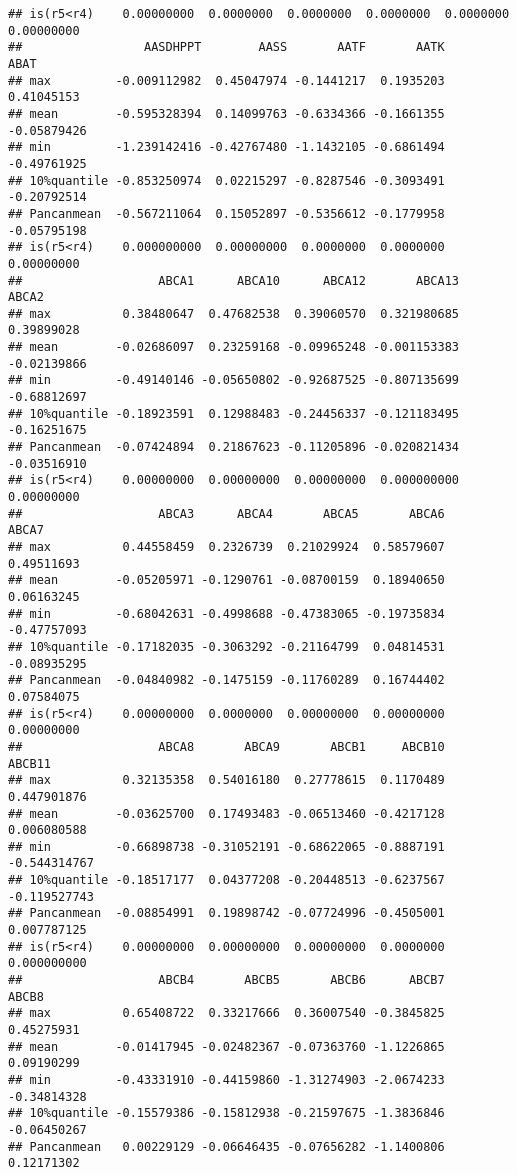 \documentclass[
]{article}
\begin{document}
\begin{verbatim}
## is(r5<r4)    0.00000000  0.0000000  0.0000000  0.0000000  0.0000000  0.00000000
##                 AASDHPPT        AASS       AATF       AATK        ABAT
## max         -0.009112982  0.45047974 -0.1441217  0.1935203  0.41045153
## mean        -0.595328394  0.14099763 -0.6334366 -0.1661355 -0.05879426
## min         -1.239142416 -0.42767480 -1.1432105 -0.6861494 -0.49761925
## 10%quantile -0.853250974  0.02215297 -0.8287546 -0.3093491 -0.20792514
## Pancanmean  -0.567211064  0.15052897 -0.5356612 -0.1779958 -0.05795198
## is(r5<r4)    0.000000000  0.00000000  0.0000000  0.0000000  0.00000000
##                   ABCA1      ABCA10      ABCA12       ABCA13       ABCA2
## max          0.38480647  0.47682538  0.39060570  0.321980685  0.39899028
## mean        -0.02686097  0.23259168 -0.09965248 -0.001153383 -0.02139866
## min         -0.49140146 -0.05650802 -0.92687525 -0.807135699 -0.68812697
## 10%quantile -0.18923591  0.12988483 -0.24456337 -0.121183495 -0.16251675
## Pancanmean  -0.07424894  0.21867623 -0.11205896 -0.020821434 -0.03516910
## is(r5<r4)    0.00000000  0.00000000  0.00000000  0.000000000  0.00000000
##                   ABCA3      ABCA4       ABCA5       ABCA6       ABCA7
## max          0.44558459  0.2326739  0.21029924  0.58579607  0.49511693
## mean        -0.05205971 -0.1290761 -0.08700159  0.18940650  0.06163245
## min         -0.68042631 -0.4998688 -0.47383065 -0.19735834 -0.47757093
## 10%quantile -0.17182035 -0.3063292 -0.21164799  0.04814531 -0.08935295
## Pancanmean  -0.04840982 -0.1475159 -0.11760289  0.16744402  0.07584075
## is(r5<r4)    0.00000000  0.0000000  0.00000000  0.00000000  0.00000000
##                   ABCA8       ABCA9       ABCB1     ABCB10       ABCB11
## max          0.32135358  0.54016180  0.27778615  0.1170489  0.447901876
## mean        -0.03625700  0.17493483 -0.06513460 -0.4217128  0.006080588
## min         -0.66898738 -0.31052191 -0.68622065 -0.8887191 -0.544314767
## 10%quantile -0.18517177  0.04377208 -0.20448513 -0.6237567 -0.119527743
## Pancanmean  -0.08854991  0.19898742 -0.07724996 -0.4505001  0.007787125
## is(r5<r4)    0.00000000  0.00000000  0.00000000  0.0000000  0.000000000
##                   ABCB4       ABCB5       ABCB6      ABCB7       ABCB8
## max          0.65408722  0.33217666  0.36007540 -0.3845825  0.45275931
## mean        -0.01417945 -0.02482367 -0.07363760 -1.1226865  0.09190299
## min         -0.43331910 -0.44159860 -1.31274903 -2.0674233 -0.34814328
## 10%quantile -0.15579386 -0.15812938 -0.21597675 -1.3836846 -0.06450267
## Pancanmean   0.00229129 -0.06646435 -0.07656282 -1.1400806  0.12171302

\end{verbatim}
\end{document}
